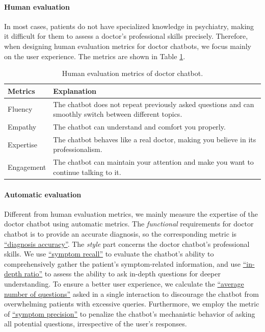\paragraph{Human evaluation} In most cases, patients do not have specialized knowledge in psychiatry, making it difficult for them to assess a doctor's professional skills precisely. Therefore, when designing human evaluation metrics for doctor chatbots, we focus mainly on the user experience. The metrics are shown in Table \ref{tab:human_eval_doctor}.
\begin{table}[h]
    \centering
    \footnotesize
    \begin{tabular}{m{}|m{}}
    \hline
    Metrics & Explanation \\
    \hline
    Fluency & The chatbot does not repeat previously asked questions and can smoothly switch between different topics. \\
    \hline
    Empathy & The chatbot can understand and comfort you properly. \\
    \hline
    Expertise & The chatbot behaves like a real doctor, making you believe in its professionalism. \\
    \hline
    Engagement & The chatbot can maintain your attention and make you want to continue talking to it. \\
    \hline
    \end{tabular}
    \caption{Human evaluation metrics of doctor chatbot.}
    \label{tab:human_eval_doctor}
\end{table}
\paragraph{Automatic evaluation}
Different from human evaluation metrics, we mainly measure the expertise of the doctor chatbot using automatic metrics. 
The \textit{functional} requirements for doctor chatbot is to provide an accurate diagnosis, so the corresponding metric is \uline{``diagnosis accuracy''}. 
The \textit{style} part concerns the doctor chatbot's professional skills. We use \uline{``symptom recall''} to evaluate the chatbot's ability to comprehensively gather the patient's symptom-related information, and use \uline{``in-depth ratio''} to assess the ability to ask in-depth questions for deeper understanding. 
To ensure a better user experience, we calculate the \uline{``average number of questions''} asked in a single interaction to discourage the chatbot from overwhelming patients with excessive queries. Furthermore, we employ the metric of \uline{``symptom precision''} to penalize the chatbot's mechanistic behavior of asking all potential questions, irrespective of the user's responses. 


